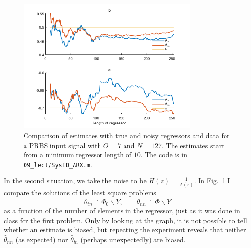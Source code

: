 \begin{figure}[h]
  \centering
  \includegraphics[width=0.8\textwidth]{09_lect/ARX-bias.png}
  \caption{Comparison of estimates with true and noisy regressors and data for a PRBS input signal with $O=7$ and $N=127$. The estimates start from a minimum regressor length of $10$. The code is in \texttt{09\_lect/SysID\_ARX.m}.}
  \label{fig:estimate-bias-ARX}
\end{figure}

In the second situation, we take the noise to be $H(z) = \frac{1}{A(z)}$. In Fig.~\ref{fig:estimate-bias-ARX} I compare the solutions of the least square problems
\begin{equation*}
  \hat{\theta}_{tn} \doteq \Phi_0\backslash Y,\hspace{2em} \hat{\theta}_{nn} \doteq \Phi\backslash Y
\end{equation*}
as a function of the number of elements in the regressor, just as it was done in class for the first problem. Only by looking at the graph, it is not possible to tell whether an estimate is biased, but repeating the experiment reveals that neither $\hat{\theta}_{nn}$ (as expected) nor $\hat{\theta}_{tn}$ (perhaps unexpectedly) are biased.

